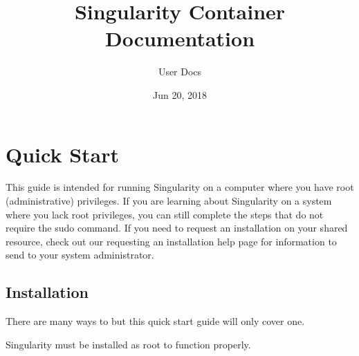 \documentclass[letterpaper,10pt,english]{sphinxmanual}
\title{Singularity Container Documentation}
\date{Jun 20, 2018}
\author{User Docs}
\begin{document}
\maketitle
\sphinxtableofcontents
{}\label{\detokenize{index::doc}}



\chapter{Quick Start}
\label{\detokenize{quick_start:quick-start}}\label{\detokenize{quick_start::doc}}\label{\detokenize{quick_start:sec-quickstart}}
This guide is intended for running Singularity on a computer where you
have root (administrative) privileges. If you are learning about
Singularity on a system where you lack root privileges, you can still
complete the steps that do not require the sudo command. If you need to
request an installation on your shared resource, check out our
requesting an installation help page for information to send to your
system administrator.


\section{Installation}
\label{\detokenize{quick_start:installation}}\label{\detokenize{quick_start:id1}}
There are many ways to {\hyperref[\detokenize{quick_start:installation}]{}} but this quick start guide will only cover one.

%
\begin{sphinxVerbatim}[commandchars=\\\{\}]
  

 


 


  
\end{sphinxVerbatim}

Singularity must be installed as root to function properly.
\end{document}
